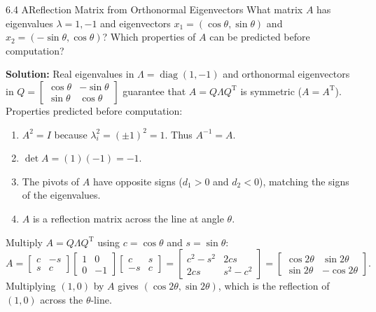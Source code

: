 \documentclass[11pt,a4paper,openany,oneside]{book}
\def\vect#1{#1}%
\def\mathbf#1{#1}%
\newcommand{\vect}[1]{\mathbf{#1}}
\newcommand{\T}{\mathrm{T}}
\numberwithin{equation}{chapter}
\begin{document}
\begin{example}{6.4 A}{Reflection Matrix from Orthonormal Eigenvectors}
What matrix $A$ has eigenvalues $\lambda = 1, -1$ and eigenvectors $\vect{x}_1 = (\cos\theta, \sin\theta)$ and $\vect{x}_2 = (-\sin\theta, \cos\theta)$? Which properties of $A$ can be predicted before computation?
\end{example}
\textbf{Solution:} Real eigenvalues in $\Lambda = \operatorname{diag}(1,-1)$ and orthonormal eigenvectors in $Q = \begin{bmatrix} \cos\theta & -\sin\theta \\ \sin\theta & \cos\theta \end{bmatrix}$ guarantee that $A = Q\Lambda Q^\T$ is symmetric ($A = A^\T$).
Properties predicted before computation:
\begin{enumerate}
\item $A^2 = I$ because $\lambda_i^2 = (\pm 1)^2 = 1$. Thus $A^{-1} = A$.
\item $\det A = (1)(-1) = -1$.
\item The pivots of $A$ have opposite signs ($d_1 > 0$ and $d_2 < 0$), matching the signs of the eigenvalues.
\item $A$ is a reflection matrix across the line at angle $\theta$.
\end{enumerate}
Multiply $A = Q\Lambda Q^\T$ using $c = \cos\theta$ and $s = \sin\theta$:
\[
A = \begin{bmatrix} c & -s \\ s & c \end{bmatrix}\begin{bmatrix} 1 & 0 \\ 0 & -1 \end{bmatrix}\begin{bmatrix} c & s \\ -s & c \end{bmatrix} = \begin{bmatrix} c^2 - s^2 & 2cs \\ 2cs & s^2 - c^2 \end{bmatrix} = \begin{bmatrix} \cos 2\theta & \sin 2\theta \\ \sin 2\theta & -\cos 2\theta \end{bmatrix}.
\]
Multiplying $(1,0)$ by $A$ gives $(\cos 2\theta, \sin 2\theta)$, which is the reflection of $(1,0)$ across the $\theta$-line.
\end{document}
